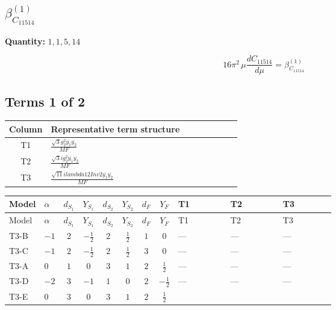 \documentclass[8pt]{article}
\begin{document}
\begin{landscape}
\section*{$\beta_{C_{11514}}^{(1)}$}
\noindent\textbf{Quantity: }$\mathrm{1,1,5,14}$\par\smallskip
\[16\pi^2\,\mu\frac{d C_{11514}}{d\mu}=\beta_{C_{11514}}^{(1)}\]
\subsection*{Terms 1 of 2}
\begin{center}
\begin{tabular}{@{}c >{\raggedright\arraybackslash}p{0.82\linewidth}@{}}
\toprule
Column & Representative term structure \\
\midrule
T1 & \(\displaystyle \frac{\sqrt{3} g_{2}^{2} \overline{y_{1}} \overline{y_{2}}}{MF}\) \\
\midrule
T2 & \(\displaystyle \frac{\sqrt{3} i g_{2}^{2} \overline{y_{1}} \overline{y_{2}}}{MF}\) \\
\midrule
T3 & \(\displaystyle \frac{\sqrt{11} i lambda12Inv2 \overline{y_{1}} \overline{y_{2}}}{MF}\) \\
\midrule
\bottomrule
\end{tabular}
\end{center}
\smallskip
\tiny
\begin{longtable}{@{}llcccccc >{\raggedright\arraybackslash}p{0.21\linewidth} >{\raggedright\arraybackslash}p{0.21\linewidth} >{\raggedright\arraybackslash}p{0.21\linewidth}@{}}
\toprule
Model & $\alpha$ & $d_{S_1}$ & $Y_{S_1}$ & $d_{S_2}$ & $Y_{S_2}$ & $d_F$ & $Y_F$ & T1 & T2 & T3 \\
\midrule
\endfirsthead
\toprule
Model & $\alpha$ & $d_{S_1}$ & $Y_{S_1}$ & $d_{S_2}$ & $Y_{S_2}$ & $d_F$ & $Y_F$ & T1 & T2 & T3 \\
\midrule
\endhead
T3-B & $-1$ & $2$ & $-\frac{1}{2}$ & $2$ & $\frac{1}{2}$ & $1$ & $0$ & --- & --- & --- \\
\midrule
T3-C & $-1$ & $2$ & $-\frac{1}{2}$ & $2$ & $\frac{1}{2}$ & $3$ & $0$ & --- & --- & --- \\
\midrule
T3-A & $0$ & $1$ & $0$ & $3$ & $1$ & $2$ & $\frac{1}{2}$ & --- & --- & --- \\
\midrule
T3-D & $-2$ & $3$ & $-1$ & $1$ & $0$ & $2$ & $-\frac{1}{2}$ & --- & --- & --- \\
\midrule
T3-E & $0$ & $3$ & $0$ & $3$ & $1$ & $2$ & $\frac{1}{2}$ & \scriptsize\adjustbox{max width=\linewidth}{$\begin{gathered} \frac{\sqrt{3} g_{2}^{2} \overline{y_{1}} \overline{y_{2}}}{6 MF}\end{gathered}$} & \scriptsize\adjustbox{max width=\linewidth}{$\begin{gathered} - \frac{11 \sqrt{3} i g_{2}^{2} \overline{y_{1}} \overline{y_{2}}}{8 MF}\end{gathered}$} & \scriptsize\adjustbox{max width=\linewidth}{$\begin{gathered} - \frac{3 \sqrt{11} i lambda12Inv2 \overline{y_{1}} \overline{y_{2}}}{22 MF}\end{gathered}$} \\

\end{longtable}
\end{landscape}
\end{document}
